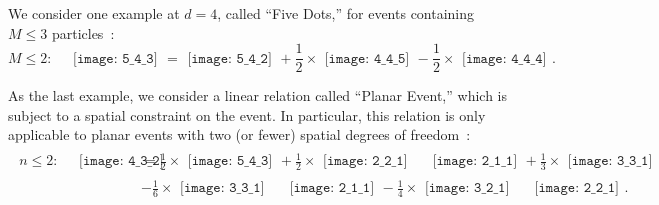\documentclass[aps,prd,twocolumn, superscriptaddress,preprintnumbers, nofootinbib,longbibliography,floatfix]{revtex4-2}
\begin{document}
%
We consider one example at $d=4$, called ``Five Dots,'' for events containing $M \leq 3$ particles~\cite{Komiske:2019asc}:
%
\begin{equation}
M \leq 2: \quad
\begin{gathered}
\texttt{[image: 5\_4\_3]}
\end{gathered}
=
\begin{gathered}
\texttt{[image: 5\_4\_2]}
\end{gathered}
+ \frac{1}{2} \times
\begin{gathered}
\texttt{[image: 4\_4\_5]}
\end{gathered}
- \frac{1}{2} \times
\begin{gathered}
\texttt{[image: 4\_4\_4]}
\end{gathered}.
\end{equation}


As the last example, we consider a linear relation called ``Planar Event,'' which is subject to a spatial constraint on the event.
%
In particular, this relation is only applicable to planar events with two (or fewer) spatial degrees of freedom~\cite{Komiske:2019asc}:
\begin{align}
\begin{split}
n \leq 2: \quad
\begin{gathered}
\texttt{[image: 4\_3\_2]}
\end{gathered}
&=
\frac{1}{2} \times
\begin{gathered}
\texttt{[image: 5\_4\_3]}
\end{gathered}
+ \frac{1}{2} \times
\begin{gathered}
\texttt{[image: 2\_2\_1]}
\end{gathered}
\quad
\begin{gathered}
\texttt{[image: 2\_1\_1]}
\end{gathered}
+ \frac{1}{3} \times
\begin{gathered}
\texttt{[image: 3\_3\_1]}
\end{gathered}
\\
&-\frac{1}{6} \times
\begin{gathered}
\texttt{[image: 3\_3\_1]}
\end{gathered}
\quad
\begin{gathered}
\texttt{[image: 2\_1\_1]}
\end{gathered}
-\frac{1}{4} \times
\begin{gathered}
\texttt{[image: 3\_2\_1]}
\end{gathered}
\quad
\begin{gathered}
\texttt{[image: 2\_2\_1]}
\end{gathered}.
\end{split}
\end{align}
\end{document}
